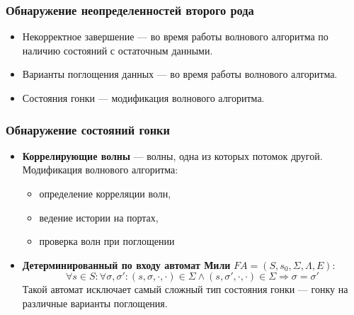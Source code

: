 \documentclass[10pt,pdf,hyperref={unicode}]{beamer}
\newcommand{\FA}{F\!A}
\begin{document}
\begin{frame}
  \frametitle{Обнаружение неопределенностей второго рода}
  \begin{itemize}
    \item Некорректное завершение --- во время работы волнового алгоритма по наличию состояний с остаточным данными.
    \item Варианты поглощения данных --- во время работы волнового алгоритма.
    \item Состояния гонки --- модификация волнового алгоритма.
  \end{itemize}
\end{frame}

\begin{frame}
  \frametitle{Обнаружение состояний гонки}
  \begin{itemize}
    \item \textbf{Коррелирующие волны} --- волны, одна из которых потомок другой.\\
    Модификация волнового алгоритма:
    \begin{itemize}
      \item определение корреляции волн,
      \item ведение истории на портах,
      \item проверка волн при поглощении
    \end{itemize}
 \item \textbf{Детерминированный по входу автомат Мили} $\FA = (S, s_0, \Sigma, \Lambda, E)$:
    $$\forall s \in S: \forall \sigma, \sigma': (s, \sigma, \cdot, \cdot) \in \Sigma \wedge (s, \sigma', \cdot, \cdot) \in \Sigma \Rightarrow \sigma = \sigma'$$
    Такой автомат исключает самый сложный тип состояния гонки --- гонку на различные варианты поглощения.
  \end{itemize}
\end{frame}
\end{document}
